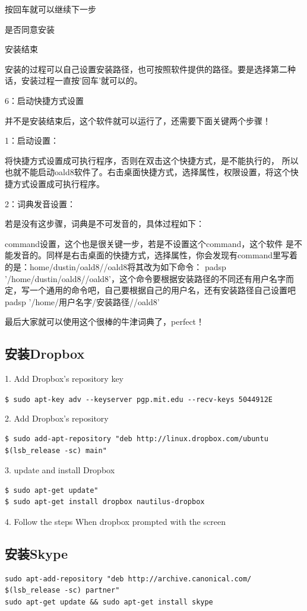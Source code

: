 按回车就可以继续下一步

是否同意安装

安装结束

安装的过程可以自己设置安装路径，也可按照软件提供的路径。要是选择第二种话，安装过程一直按'回车'就可以的。

6：启动快捷方式设置

并不是安装结束后，这个软件就可以运行了，还需要下面关键两个步骤！

1：启动设置：

将快捷方式设置成可执行程序，否则在双击这个快捷方式，是不能执行的， 所以也就不能启动oald8软件了。右击桌面快捷方式，选择属性，权限设置，将这个快捷方式设置成可执行程序。

2：词典发音设置：

若是没有这步骤，词典是不可发音的，具体过程如下：

command设置，这个也是很关键一步，若是不设置这个command，这个软件  是不能发音的。同样是右击桌面的快捷方式，选择属性，你会发现有command里写着的是：home/dustin/oald8//oald8将其改为如下命令：    padsp '/home/dustin/oald8//oald8'，这个命令要根据安装路径的不同还有用户名字而定，写一个通用的命令吧，自己要根据自己的用户名，还有安装路径自己设置吧padsp '/home/用户名字/安装路径//oald8'

最后大家就可以使用这个很棒的牛津词典了，perfect！

\subsection{安装Dropbox}
1. Add Dropbox’s repository key

\verb"$ sudo apt-key adv --keyserver pgp.mit.edu --recv-keys 5044912E"

2. Add Dropbox’s repository
\begin{verbatim}
$ sudo add-apt-repository "deb http://linux.dropbox.com/ubuntu $(lsb_release -sc) main"
\end{verbatim}

3. update and install Dropbox

\begin{verbatim}
$ sudo apt-get update"
$ sudo apt-get install dropbox nautilus-dropbox
\end{verbatim}

4. Follow the steps When dropbox prompted with the screen

\subsection{安装Skype}
\begin{verbatim}
sudo apt-add-repository "deb http://archive.canonical.com/ $(lsb_release -sc) partner"
sudo apt-get update && sudo apt-get install skype
\end{verbatim}


